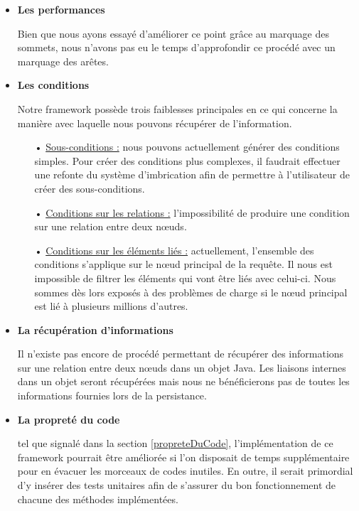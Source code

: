 \documentclass[a4paper,fleqn,12pt,oneside]{book}
\begin{document}
\begin{itemize}
\item \textbf{Les performances}

\quad Bien que nous ayons essayé d'améliorer ce point grâce au marquage des sommets, nous n'avons pas eu le temps d'approfondir ce procédé avec un marquage des arêtes.

\item \textbf{Les conditions}

\quad Notre framework possède trois faiblesses principales en ce qui concerne la manière avec laquelle nous pouvons récupérer de l'information.
\begin{itemize}
	\item[•] \underline{Sous-conditions :} nous pouvons actuellement générer des conditions simples. Pour créer des conditions plus complexes, il faudrait effectuer une refonte du système d'imbrication afin de permettre à l'utilisateur de créer des sous-conditions. 
	\item[•] \underline{Conditions sur les relations :} l'impossibilité de produire une condition sur une relation entre deux nœuds.
	\item[•] \underline{Conditions sur les éléments liés :} actuellement, l'ensemble des conditions s'applique sur le nœud principal de la requête. Il nous est impossible de filtrer les éléments qui vont être liés avec celui-ci. Nous sommes dès lors exposés à des problèmes de charge si le nœud principal est lié à plusieurs millions d'autres.
\end{itemize}

\item \textbf{La récupération d'informations}

\quad Il n'existe pas encore de procédé permettant de récupérer des informations sur une relation entre deux nœuds dans un objet Java. Les  liaisons internes dans un objet seront récupérées mais nous ne bénéficierons pas de toutes les informations fournies lors de la persistance.

\item \textbf{La propreté du code}

\quad tel que signalé dans la section \ref{propreteDuCode}, l'implémentation de ce framework pourrait être améliorée si l'on disposait de temps supplémentaire pour en évacuer les morceaux de codes inutiles. En outre, il serait primordial d'y insérer des tests unitaires afin de s'assurer du bon fonctionnement de chacune des méthodes implémentées.

\end{itemize}  
\end{document}
